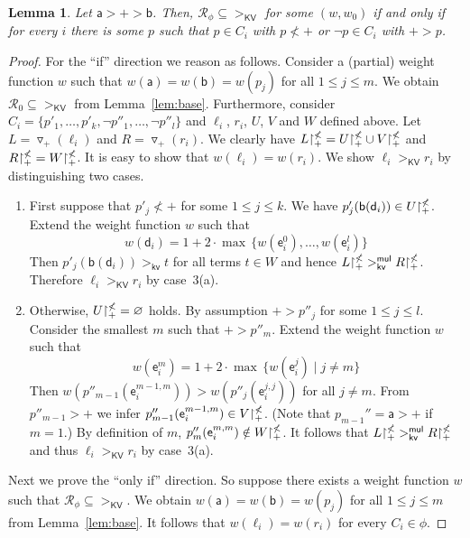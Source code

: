 \documentclass{tlp}
\newtheorem{lemma}[theorem]{Lemma}
\newcommand{\tf}[1]{{\triangledown_{\!#1}}}
\newcommand{\m}[1]{\mathsf{#1}}
\newcommand{\mc}[1]{\mathcal{#1}}
\newcommand{\mr}[1]{\mathrm{#1}}
\newcommand{\Wt}{\m{w,root}}
\renewcommand{\Wt}{\m{kv}}
\newcommand{\mul}{\m{mul}}
\newcommand{\KV}{\mr{\m{KV}}}
\newcommand{\rrs}[3][f]{{#2}{\restriction}^{\smash{#3}}_{#1}}
\newcommand{\RR}{\mc{R}}
\newcommand{\High}{\m{a}}
\newcommand{\Low}{\m{b}}
\newcommand{\Top}{\m{d}}
\newcommand{\ToP}{\m{e}}
\begin{document}
\begin{lemma}
\label{lem:clause}
Let $\High > + > \Low$. Then, $\RR_\phi \subseteq {>_\KV}$
for some $(w, w_0)$ if and only if for every $i$
there is some $p$ such that $p \in C_i$ with $p \nless +$ or
$\neg p \in C_i$ with $+ > p$.
\end{lemma}
\begin{proof}
For the ``if'' direction we reason as follows.
Consider a (partial) weight function $w$ such that
$w(\High) = w(\Low) = w(p_j)$ for all $1 \leqslant j \leqslant m$.
We obtain $\RR_0 \subseteq {>_\KV}$ from Lemma~\ref{lem:base}.
Furthermore, consider 
$C_i = \{ p'_1,\dots,p'_k, \neg p''_1,\dots, \neg p''_l \}$ and
$\ell_i$, $r_i$, $U$, $V$ and $W$ defined above.
Let $L = \tf{+}(\ell_i)$ and $R = \tf{+}(r_i)$.
We clearly have
$\rrs[+]{L}{\nless} = \rrs[+]{U}{\nless} \cup \rrs[+]{V}{\nless}$ and
$\rrs[+]{R}{\nless} = \rrs[+]{W}{\nless}$.
It is easy to show that $w(\ell_i) = w(r_i)$.
We show $\ell_i >_\KV r_i$ by distinguishing two cases.
\begin{enumerate}
\item
First suppose that
$p'_j \nless +$ for some $1 \leqslant j \leqslant k$.
We have $p'_j(\Low(\Top_i)) \in \rrs[+]{U}{\nless}$.
Extend the weight function $w$ such that
\[
w(\Top_i) = 1 + 2 \cdot \max\,\{ w(\ToP_i^0), \dots, w(\ToP_i^l) \}
\]
Then $p'_j(\Low(\Top_i)) >_\Wt t$ for all terms $t \in W$ and hence
$\rrs[+]{L}{\nless} >_\Wt^\mul \rrs[+]{R}{\nless}$.
Therefore $\ell_i >_\KV r_i$ by case~3(a).
\smallskip
\item
Otherwise, $\rrs[+]{U}{\nless} = \varnothing$ holds. By assumption
$+ > p''_j$ for some $1 \leqslant j \leqslant l$.
Consider the smallest $m$ such that $+ > p''_m$.
Extend the weight function $w$ such that
\[
w(\ToP_i^m) = 1 + 2 \cdot \max\,\{ w(\ToP_i^j) \mid j \neq m \}
\]
Then
$w(p''_{m-1}(\ToP_i^{m-1,m})) > w(p''_j(\ToP_i^{j,j}))$
for all $j \neq m$. From $p''_{m-1} > +$ we infer
$p''_{m-1}(\ToP_i^{m-1,m}) \in \rrs[+]{V}{\nless}$.
(Note that $p_{m-1}'' = \High > +$ if $m = 1$.)
By definition of $m$,
$p''_m(\ToP_i^{m,m}) \notin \rrs[+]{W}{\nless}$.
It follows that
$\rrs[+]{L}{\nless} >_\Wt^\mul \rrs[+]{R}{\nless}$ and thus
$\ell_i >_\KV r_i$ by case~3(a).
\end{enumerate}
Next we prove the ``only if'' direction. So suppose
there exists a weight function $w$ such that
$\RR_\phi \subseteq {>_\KV}$.
We obtain $w(\High) = w(\Low) = w(p_j)$ for all $1 \leqslant j \leqslant m$
from Lemma~\ref{lem:base}. It follows that $w(\ell_i) = w(r_i)$
for every $C_i \in \phi$.

\end{proof}
\end{document}
